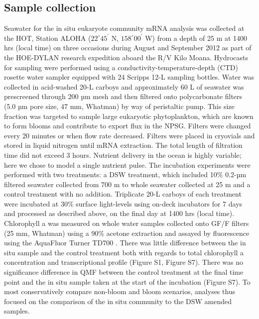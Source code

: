 \subsection{Sample collection}
Seawater for the in situ eukaryote community mRNA analysis was collected at the HOT, Station ALOHA ($22^\circ 45^\prime$ N, $158^\circ 00^\prime$ W) from a depth of 25 m at 1400 hrs (local time) on three occasions during August and September 2012 as part of the HOE-DYLAN research expedition aboard the R/V Kilo Moana. Hydrocasts for sampling were performed using a conductivity-temperature-depth (CTD) rosette water sampler equipped with 24 Scripps 12-L sampling bottles. Water was collected in acid-washed 20-L carboys and approximately 60 L of seawater was prescreened through 200 µm mesh and then filtered onto polycarbonate filters (5.0 µm pore size, 47 mm, Whatman) by way of peristaltic pump. This size fraction was targeted to sample large eukaryotic phytoplankton, which are known to form blooms and contribute to export flux in the NPSG. Filters were changed every 20 minutes or when flow rate decreased. Filters were placed in cryovials and stored in liquid nitrogen until mRNA extraction. The total length of filtration time did not exceed 3 hours. Nutrient delivery in the ocean is highly variable; here we chose to model a single nutrient pulse. The incubation experiments were performed with two treatments: a DSW treatment, which included 10\% 0.2-µm filtered seawater collected from 700 m to whole seawater collected at 25 m and a control treatment with no addition. Triplicate 20-L carboys of each treatment were incubated at 30\% surface light-levels using on-deck incubators for 7 days and processed as described above, on the final day at 1400 hrs (local time). Chlorophyll a was measured on whole water samples collected onto GF/F filters (25 mm, Whatman) using a 90\% acetone extraction and assayed by fluorescence using the AquaFluor Turner TD700 \citep{Parsons1984}. There was little difference between the in situ sample and the control treatment both with regards to total chlorophyll a concentration and transcriptional profile (Figure S1, Figure S7).  There was no significance difference in QMF between the control treatment at the final time point and the in situ sample taken at the start of the incubation (Figure S7). To most conservatively compare non-bloom and bloom scenarios, analyses thus focused on the comparison of the in situ community to the DSW amended samples. \par
